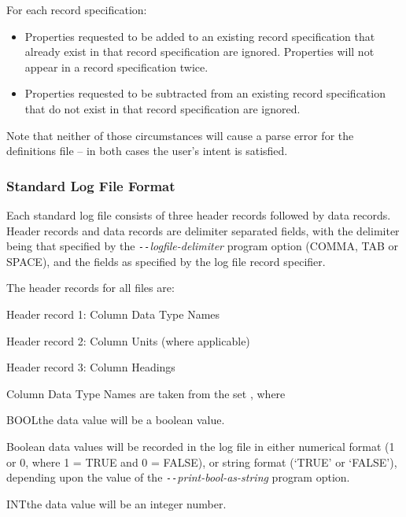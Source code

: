 \newpage
For each record specification:

\begin{itemize}
\item  Properties requested to be added to an existing record specification that already exist in that record specification are ignored.  Properties will not appear in a record specification twice.
\item  Properties requested to be subtracted from an existing record specification that do not exist in that record specification are ignored.
\end{itemize}

Note that neither of those circumstances will cause a parse error for the definitions file -- in both cases the user's intent is satisfied.

\newpage
\subsubsection{Standard Log File Format}\label{sec:StandardLogFileFormat}

Each standard log file consists of three header records followed by data records.  Header records and data records are delimiter separated fields, with the delimiter being that specified by the \textit{\texttt{-{}-}logfile-delimiter} program option (COMMA, TAB or SPACE), and the fields as specified by the log file record specifier.

The header records for all files are:

\tabto{3em}Header record 1: Column Data Type Names\par
\tabto{3em}Header record 2: Column Units (where applicable)\par
\tabto{3em}Header record 3: Column Headings

\bigskip
Column Data Type Names are taken from the set , where

\tabto{3em}BOOL\tabto{7.5em}the data value will be a boolean value.

\hfill
\begin{minipage}{\dimexpr\textwidth-7.5em}
Boolean data values will be recorded in the log file in either numerical format (1 or 0, where 1 = TRUE and  0 = FALSE), or string format (`TRUE' or `FALSE'), depending upon the value of the \textit{\texttt{-{}-}print-bool-as-string} program option.
\end{minipage}

\medskip
\medskip
\tabto{3em}INT\tabto{7.5em}the data value will be an integer number.

